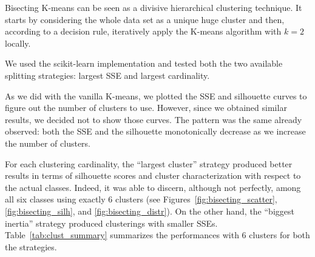\documentclass[10pt, a4paper, twocolumn]{article}
\begin{document}
Bisecting K-means can be seen as a divisive hierarchical clustering technique. It starts by considering the whole data set as a unique huge cluster and then, according to a decision rule, iteratively apply the K-means algorithm with $k=2$ locally.

We used the scikit-learn implementation and tested both the two available splitting strategies: largest SSE and largest cardinality. 

As we did with the vanilla K-means, we plotted the SSE and silhouette curves to figure out the number of clusters to use. However, since we obtained similar results, we decided not to show those curves. The pattern was the same already observed: both the SSE and the silhouette monotonically decrease as we increase the number of clusters. 

For each clustering cardinality, the ``largest cluster'' strategy produced better results in terms of silhouette scores and cluster characterization with respect to the actual classes. Indeed, it was able to discern, although not perfectly, among all six classes using exactly 6 clusters (see Figures~\ref{fig:bisecting_scatter}, \ref{fig:bisecting_silh}, and \ref{fig:bisecting_distr}). On the other hand, the ``biggest inertia'' strategy produced clusterings with smaller SSEs. Table~\ref{tab:clust_summary} summarizes the performances with 6 clusters for both the strategies. 
\end{document}
